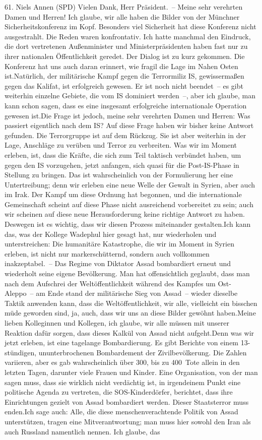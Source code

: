 \documentclass{article}
\begin{document}
	61. Niels Annen (SPD) Vielen Dank, Herr Präsident. – Meine sehr verehrten Damen und Herren! Ich glaube, wir alle haben die Bilder von der Münchner Sicherheitskonferenz im Kopf. Besonders viel Sicherheit hat diese Konferenz nicht ausgestrahlt. Die Reden waren konfrontativ. Ich hatte manchmal den Eindruck, die dort vertretenen Außenminister und Ministerpräsidenten haben fast nur zu ihrer nationalen Öffentlichkeit geredet. Der Dialog ist zu kurz gekommen. Die Konferenz hat uns auch daran erinnert, wie fragil die Lage im Nahen Osten ist.Natürlich, der militärische Kampf gegen die Terrormiliz IS, gewissermaßen gegen das Kalifat, ist erfolgreich gewesen. Er ist noch nicht beendet – es gibt weiterhin einzelne Gebiete, die vom IS dominiert werden –, aber ich glaube, man kann schon sagen, dass es eine insgesamt erfolgreiche internationale Operation gewesen ist.Die Frage ist jedoch, meine sehr verehrten Damen und Herren: Was passiert eigentlich nach dem IS? Auf diese Frage haben wir bisher keine Antwort gefunden. Die Terrorgruppe ist auf dem Rückzug. Sie ist aber weiterhin in der Lage, Anschläge zu verüben und Terror zu verbreiten. Was wir im Moment erleben, ist, dass die Kräfte, die sich zum Teil taktisch verbündet haben, um gegen den IS vorzugehen, jetzt anfangen, sich quasi für die Post-IS-Phase in Stellung zu bringen. Das ist wahrscheinlich von der Formulierung her eine Untertreibung; denn wir erleben eine neue Welle der Gewalt in Syrien, aber auch im Irak. Der Kampf um diese Ordnung hat begonnen, und die internationale Gemeinschaft scheint auf diese Phase nicht ausreichend vorbereitet zu sein; auch wir scheinen auf diese neue Herausforderung keine richtige Antwort zu haben. Deswegen ist es wichtig, dass wir diesen Prozess miteinander gestalten.Ich kann das, was der Kollege Wadephul hier gesagt hat, nur wiederholen und unterstreichen: Die humanitäre Katastrophe, die wir im Moment in Syrien erleben, ist nicht nur markerschütternd, sondern auch vollkommen inakzeptabel. – Das Regime von Diktator Assad bombardiert erneut und wiederholt seine eigene Bevölkerung. Man hat offensichtlich geglaubt, dass man nach dem Aufschrei der Weltöffentlichkeit während des Kampfes um Ost-Aleppo – am Ende stand der militärische Sieg von Assad – wieder dieselbe Taktik anwenden kann, dass die Weltöffentlichkeit, wir alle, vielleicht ein bisschen müde geworden sind, ja, auch, dass wir uns an diese Bilder gewöhnt haben.Meine lieben Kolleginnen und Kollegen, ich glaube, wir alle müssen mit unserer Reaktion dafür sorgen, dass dieses Kalkül von Assad nicht aufgeht.Denn was wir jetzt erleben, ist eine tagelange Bombardierung. Es gibt Berichte von einem 13-stündigen, ununterbrochenen Bombardement der Zivilbevölkerung. Die Zahlen variieren, aber es gab wahrscheinlich über 300, bis zu 400 Tote allein in den letzten Tagen, darunter viele Frauen und Kinder. Eine Organisation, von der man sagen muss, dass sie wirklich nicht verdächtig ist, in irgendeinem Punkt eine politische Agenda zu vertreten, die SOS-Kinderdörfer, berichtet, dass ihre Einrichtungen gezielt von Assad bombardiert werden. Dieser Staatsterror muss enden.Ich sage auch: Alle, die diese menschenverachtende Politik von Assad unterstützen, tragen eine Mitverantwortung; man muss hier sowohl den Iran als auch Russland namentlich nennen. Ich glaube, das 
\end{document}
